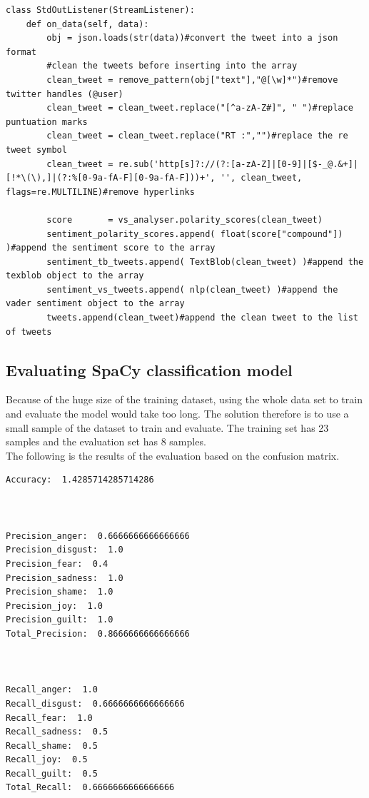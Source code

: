 \begin{lstlisting}
class StdOutListener(StreamListener):
    def on_data(self, data):
        obj = json.loads(str(data))#convert the tweet into a json format
        #clean the tweets before inserting into the array
        clean_tweet = remove_pattern(obj["text"],"@[\w]*")#remove twitter handles (@user)
        clean_tweet = clean_tweet.replace("[^a-zA-Z#]", " ")#replace puntuation marks
        clean_tweet = clean_tweet.replace("RT :","")#replace the re tweet symbol
        clean_tweet = re.sub('http[s]?://(?:[a-zA-Z]|[0-9]|[$-_@.&+]|[!*\(\),]|(?:%[0-9a-fA-F][0-9a-fA-F]))+', '', clean_tweet, flags=re.MULTILINE)#remove hyperlinks
        
        score       = vs_analyser.polarity_scores(clean_tweet)
        sentiment_polarity_scores.append( float(score["compound"]) )#append the sentiment score to the array
        sentiment_tb_tweets.append( TextBlob(clean_tweet) )#append the texblob object to the array
        sentiment_vs_tweets.append( nlp(clean_tweet) )#append the vader sentiment object to the array
        tweets.append(clean_tweet)#append the clean tweet to the list of tweets
\end{lstlisting}



\subsection{Evaluating SpaCy classification model}
Because of the huge size of the training dataset, using the whole data set to train and evaluate the model would take too long. The solution therefore is to use a small sample of the dataset to train and evaluate.
The training set has 23 samples and the evaluation set has 8 samples.\\
The following is the results of the evaluation based on the confusion matrix.

\begin{lstlisting}
Accuracy:  1.4285714285714286



Precision_anger:  0.6666666666666666
Precision_disgust:  1.0
Precision_fear:  0.4
Precision_sadness:  1.0
Precision_shame:  1.0
Precision_joy:  1.0
Precision_guilt:  1.0
Total_Precision:  0.8666666666666666



Recall_anger:  1.0
Recall_disgust:  0.6666666666666666
Recall_fear:  1.0
Recall_sadness:  0.5
Recall_shame:  0.5
Recall_joy:  0.5
Recall_guilt:  0.5
Total_Recall:  0.6666666666666666
\end{lstlisting}

